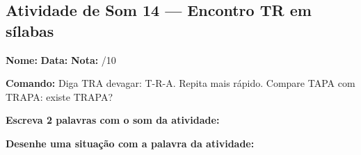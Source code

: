 \subsection{Atividade de Som 14 --- Encontro TR em sílabas}
\begin{exercicio}



\noindent\textbf{Nome:} \underline{\hspace{3.2cm}} \quad \textbf{Data:} \underline{\hspace{1.6cm}} \quad \textbf{Nota:} \underline{\hspace{0.9cm}}/10


\noindent\textbf{Comando:} Diga TRA devagar: T-R-A. Repita mais rápido. Compare TAPA com TRAPA: existe TRAPA?


\begin{center}
\end{center}

\noindent\textbf{Escreva 2 palavras com o som da atividade:}

\begin{center}
  \underline{\hspace{3cm}} \quad \underline{\hspace{3cm}}
\end{center}

\noindent\textbf{Desenhe uma situação com a palavra da atividade:}

\begin{center}
\end{center}

\end{exercicio}



